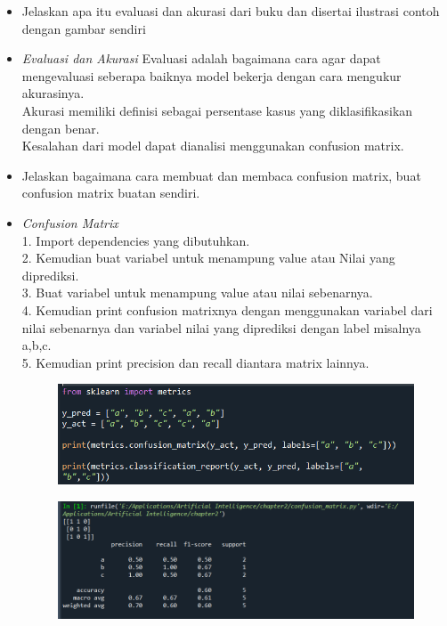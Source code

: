\begin{enumerate}
\begin{itemize}
\begin{figure}[!htbp]
	\end{figure}
	\par
	\item
	Jelaskan apa itu evaluasi dan akurasi dari buku dan disertai ilustrasi contoh dengan gambar sendiri
	\par
	\item 
	\textit{Evaluasi dan Akurasi}
	Evaluasi adalah bagaimana cara agar dapat mengevaluasi seberapa baiknya model bekerja dengan cara mengukur akurasinya.\\
	Akurasi memiliki definisi sebagai persentase kasus yang diklasifikasikan dengan benar.\\
	Kesalahan dari model dapat dianalisi menggunakan confusion matrix.\\
	\par
	\item
	Jelaskan bagaimana cara membuat dan membaca confusion matrix, buat confusion matrix buatan sendiri.
	\par
	\item 
	\textit{Confusion Matrix}\\ 
	1. Import dependencies yang dibutuhkan.\\
	2. Kemudian buat variabel untuk menampung value atau Nilai yang diprediksi.\\
	3. Buat variabel untuk menampung value atau nilai sebenarnya.\\
	4. Kemudian print confusion matrixnya dengan menggunakan variabel dari nilai sebenarnya dan variabel nilai yang diprediksi dengan label misalnya a,b,c.\\
	5. Kemudian print precision dan recall diantara matrix lainnya.
	\begin{figure}[!htbp]
		\centering
		\includegraphics[scale=0.8]{figures/confusionmatrix.PNG}
	\end{figure}
	\begin{figure}[!htbp]
		\centering
		\includegraphics[scale=0.6]{figures/hasilconfusionmatrix.PNG}

\end{figure}
\end{itemize}
\end{enumerate}
